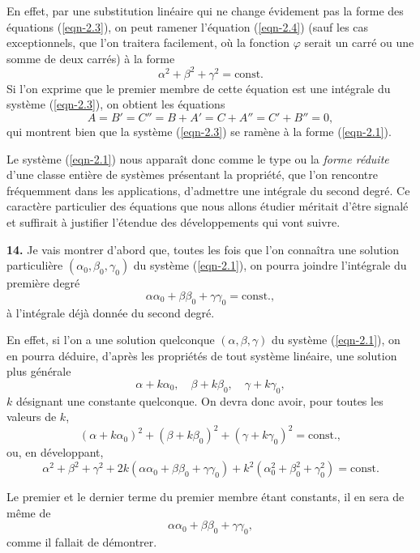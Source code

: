 En effet, par une substitution linéaire qui ne change évidement pas la forme des équations (\ref{eqn-2.3}), on peut 
ramener l'équation (\ref{eqn-2.4}) (sauf les cas exceptionnels, que l'on traitera facilement, où la fonction $\varphi$ 
serait un carré ou une somme de deux carrés) à la forme
\begin{equation}
\alpha^2 + \beta^2 + \gamma^2 = \textrm{const.}
\label{eqn-2.5}
\end{equation}
Si l'on exprime que le premier membre de cette équation est une intégrale du système (\ref{eqn-2.3}), on obtient les 
équations
\[
A = B' = C'' = B + A' = C + A'' = C' + B'' = 0,
\]
qui montrent bien que la système (\ref{eqn-2.3}) se ramène à la forme (\ref{eqn-2.1}).

Le système (\ref{eqn-2.1}) nous apparaît donc comme le type ou la \textit{forme réduite} d'une classe entière de 
systèmes présentant la propriété, que l'on rencontre fréquemment dans les applications, d'admettre une intégrale du 
second degré. Ce caractère particulier des équations que nous allons étudier méritait d'être signalé et suffirait à 
justifier l'étendue des développements qui vont suivre.

\textbf{14.} Je vais montrer d'abord que, toutes les fois que l'on connaîtra une solution particulière $(\alpha_0, 
\beta_0, \gamma_0)$ du système (\ref{eqn-2.1}), on pourra joindre l'intégrale du première degré
\[
\alpha\alpha_0 + \beta\beta_0 + \gamma\gamma_0 = \textrm{const.},
\]
à l'intégrale déjà donnée du second degré.

En effet, si l'on a une solution quelconque $(\alpha, \beta, \gamma)$ du système (\ref{eqn-2.1}), on en pourra déduire, 
d'après les propriétés de tout système linéaire, une solution plus générale
\[
\alpha + k\alpha_0, \quad \beta + k\beta_0, \quad \gamma + k\gamma_0,
\]
$k$ désignant une constante quelconque. On devra donc avoir, pour toutes les valeurs de $k$,
\[
(\alpha + k\alpha_0)^2 + (\beta + k\beta_0)^2 + (\gamma + k\gamma_0)^2 = \textrm{const.},
\]
ou, en développant,
\[
\alpha^2 + \beta^2 + \gamma^2 + 2k(\alpha\alpha_0 + \beta\beta_0 + \gamma\gamma_0) + k^2(\alpha_0^2 + \beta_0^2 + 
\gamma_0^2) = \textrm{const.}
\]

Le premier et le dernier terme du premier membre étant constants, il en sera de même de
\[
\alpha\alpha_0 + \beta\beta_0 + \gamma\gamma_0,
\]
comme il fallait de démontrer.

